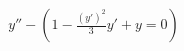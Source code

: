 \documentclass[preview]{standalone}
\begin{document}
\begin{align*}
y''-(1-\frac{(y')^2}{3}y'+y=0)
\end{align*}
\end{document}
